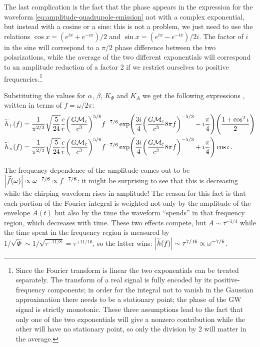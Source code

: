 \documentclass[main.tex]{subfiles}
\begin{document}
The last complication is the fact that the phase appears in the expression for the waveform \eqref{eq:amplitude-quadrupole-emission} not with a complex exponential, but instead with a cosine or a sine: this is not a problem, we just need to use the relations \(\cos x = (e^{ix}+e^{-ix}) / 2\) and \(\sin x = (e^{ix}- e^{-ix}) / 2i\). 
The factor of \(i\) in the sine will correspond to a \(\pi /2\) phase difference between the two polarizations, while the average of the two different exponentials will correspond to an amplitude reduction of a factor 2 if we restrict ourselves to positive frequencies.\footnote{Since the Fourier transform is linear the two exponentials can be treated separately. The transform of a real signal is fully encoded by its positive-frequency components; in order for the integral not to vanish in the Gaussian approximation there needs to be a stationary point; the phase of the \ac{GW} signal is strictly monotonic. These three assumptions lead to the fact that only one of the two exponentials will give a nonzero contribution while the other will have no stationary point, so only the division by 2 will matter in the average.}

Substituting the values for \(\alpha \), \(\beta \), \(K_\Phi \) and \(K_A\) we get the following expressions \cite[eqs.\ 4.34--37]{maggioreGravitationalWavesVolume2007}, written in terms of \(f = \omega / 2\pi \): 
%
\begin{subequations} \label{eq:spa-waveforms}
\begin{align} 
\widetilde{h}_{+}(f) &= \frac{1}{\pi^{2/3}} \sqrt{ \frac{5}{24}} 
\frac{c}{r} \qty( \frac{G \mathcal{M}_c}{c^3})^{5/6} f^{-7/6} 
\exp(\frac{3i}{4} \qty(\frac{G \mathcal{M}_c}{c^3} 8 \pi f)^{-5/3} - i \frac{\pi}{4})
\qty( \frac{1 + \cos^2\iota }{2}) 
\\
\widetilde{h}_{ \times }(f) &= \frac{1}{\pi^{2/3}} \sqrt{ \frac{5}{24}} 
\frac{c}{r} \qty( \frac{G \mathcal{M}_c}{c^3})^{5/6} f^{-7/6} 
\exp(\frac{3i}{4} \qty(\frac{G \mathcal{M}_c}{c^3} 8 \pi f)^{-5/3} + i \frac{\pi}{4})
\cos \iota 
\,.
\end{align}
\end{subequations}

The frequency dependence of the amplitude comes out to be \(\abs{\widetilde{f}(\omega )} \propto \omega^{-7/6} \propto f^{-7/6}\):  it might be surprising to see that this is decreasing while the chirping waveform rises in amplitude! 
The reason for this fact is that each portion of the Fourier integral is weighted not only by the amplitude of the envelope \(A(t)\) but also by the time the waveform ``spends'' in that frequency region, which decreases with time. 
These two effects compete, but \(A \sim \tau^{-1/4}\) while the time spent in the frequency region is measured by \(1/ \sqrt{\ddot{\Phi}} \sim 1/ \sqrt{\tau^{-11/8}} = \tau^{+11/16}\), so the latter wins: \(\abs{\widetilde{h}(f)} \sim \tau^{7/16} \propto \omega^{-7/6}\). 
\end{document}
